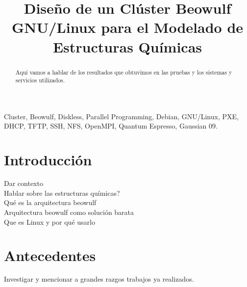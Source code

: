 \documentclass[journal]{IEEEtran}
\begin{document}
\title{Diseño de un Clúster Beowulf GNU/Linux para el Modelado de Estructuras Químicas}

\author{
}


\maketitle

\begin{abstract}
    Aquí vamos a hablar de los resultados que obtuvimos en las pruebas y los sistemas y servicios utilizados.
\end{abstract}

\begin{IEEEkeywords}
    Cluster, Beowulf, Diskless, Parallel Programming, Debian, GNU/Linux, PXE, DHCP, TFTP, SSH, NFS, OpenMPI, Quantum Espresso, Gaussian 09.
\end{IEEEkeywords}

\section{Introducción}
Dar contexto
\\
Hablar sobre las estructuras químicas?
\\
Qué es la arquitectura beowulf
\\
Arquitectura beowulf como solución barata
\\
Que es Linux y por qué usarlo

\section{Antecedentes}

Investigar y mencionar a grandes razgos trabajos ya realizados.
\end{document}
